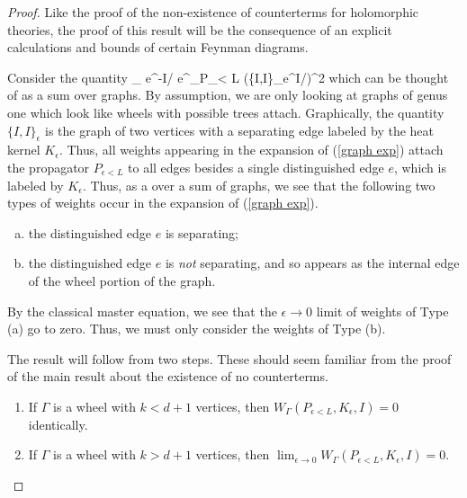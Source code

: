 \documentclass[10pt]{article}
\begin{document}
\begin{proof}

Like the proof of the non-existence of counterterms for holomorphic theories, the proof of this result will be the consequence of an explicit calculations and bounds of certain Feynman diagrams. 

Consider the quantity
\be\label{graph exp}
\lim_{\epsilon {}} e^{-I/\hbar} e^{\hbar \partial_{P_{\epsilon < L}}} \left(\{I,I\}_\epsilon e^{I/\hbar}\right)\mod \hbar^2
\ee
which can be thought of as a sum over graphs.
By assumption, we are only looking at graphs of genus one which look like wheels with possible trees attach.
Graphically, the quantity $\{I,I\}_\epsilon$ is the graph of two vertices with a separating edge labeled by the heat kernel $K_\epsilon$.
Thus, all weights appearing in the expansion of (\ref{graph exp}) attach the propagator $P_{\epsilon<L}$ to all edges besides a single distinguished edge $e$, which is labeled by $K_\epsilon$. 
Thus, as a over a sum of graphs, we see that the following two types of weights occur in the expansion of (\ref{graph exp}).
\begin{enumerate}[(a)]
\item the distinguished edge $e$ is separating;
\item the distinguished edge $e$ is {\em not} separating, and so appears as the internal edge of the wheel portion of the graph.
\end{enumerate}

By the classical master equation, we see that the $\epsilon \to 0$ limit of weights of Type (a) go to zero.
Thus, we must only consider the weights of Type (b). 

The result will follow from two steps.
These should seem familiar from the proof of the main result about the existence of no counterterms.
\begin{enumerate}
\item If $\Gamma$ is a wheel with $k < d+1$ vertices, then $ W_\Gamma(P_{\epsilon < L}, K_\epsilon,I)
 = 0$ identically. 
\item If $\Gamma$ is a wheel with $k > d+1$ vertices, then $\lim_{\epsilon \to 0} W_\Gamma(P_{\epsilon < L}, K_\epsilon,I) =0$.
\end{enumerate} 


\end{proof}
\end{document}
